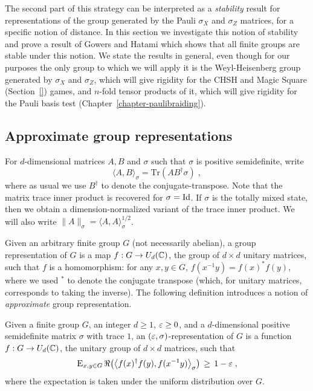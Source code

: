 The second part of this strategy can be interpreted as a \emph{stability} result for representations of the group generated by the Pauli $\sigma_X$ and $\sigma_Z$ matrices, for a specific notion of distance. In this section we investigate this notion of stability and prove a result of Gowers and Hatami which shows that all finite groups are stable under this notion. We state the results in general, even though for our purposes the only group to which we will apply it is the Weyl-Heisenberg group generated by $\sigma_X$ and $\sigma_Z$, which will give rigidity for the CHSH and Magic Square (Section~\ref{}) games, and $n$-fold tensor products of it, which will give rigidity for the Pauli basis test (Chapter~\ref{chapter-paulibraiding}).


\subsection{Approximate group representations}
\label{section-approxrep}

For $d$-dimensional matrices  $A,B$ and $\sigma$ such that $\sigma$ is positive semidefinite, write 
$$\langle A,B\rangle_\sigma = \mathrm{Tr}(AB^\dagger \sigma)\;,$$
where as usual we use $B^\dagger$ to denote the conjugate-transpose. Note that the matrix trace inner product is recovered for $\sigma = \mathop{\rm Id}\nolimits$. If $\sigma$ is the totally mixed state, then we obtain a dimension-normalized variant of the trace inner product. We will also write $\|A\|_\sigma = \langle A,A\rangle_\sigma^{1/2}$. 

Given an arbitrary finite group $G$ (not necessarily abelian), a group representation of $G$ is a map $f:G \to U_d(\mathbb{C})$, the group of $d\times d$ unitary matrices, such that $f$ is a homomorphism: for any $x,y\in G$, $f(x^{-1}y)=f(x)^* f(y)$, where we used $^*$ to denote the conjugate transpose (which, for unitary matrices, corresponds to taking the inverse). The following definition introduces a notion of \emph{approximate} group representation.  

\begin{definition}
\label{def:approx-rep}
Given a finite group $G$, an integer $d\geq 1$, $\varepsilon\geq 0$, and a $d$-dimensional positive semidefinite matrix $\sigma$ with trace $1$, an $(\varepsilon,\sigma)$-representation of $G$ is a function $f: G \to U_d(\mathbb{C})$, the unitary group of $d\times d$ matrices, such that 
\begin{equation}
\label{eq:gh-condition}
\textsc{E}_{x,y\in G} \,\Re\big(\big\langle f(x)^\dagger f(y) ,f(x^{-1}y) \big\rangle_\sigma\big) \,\geq\, 1-\varepsilon\;,
\end{equation} 
where the expectation is taken under the uniform distribution over $G$.
\end{definition}

